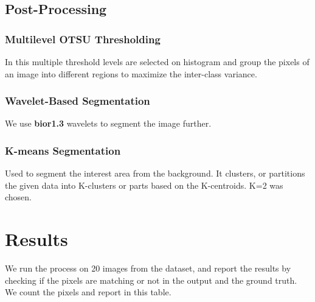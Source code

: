 \documentclass{article}
\begin{document}
\subsection{Post-Processing}

\subsubsection{Multilevel OTSU Thresholding}
In this multiple threshold levels are selected on histogram and group the pixels of an image into different regions to 
maximize the inter-class variance.

\subsubsection{Wavelet-Based Segmentation}
We use \textbf{bior1.3} wavelets to segment the image further.

\subsubsection{K-means Segmentation}
Used to segment the interest area from the background. It clusters, or partitions the given data into K-clusters or parts based on the K-centroids. K=2 was chosen.

\clearpage
\section{Results}
We run the process on 20 images from the dataset, and report the results by checking if the pixels are matching or not in the output and the ground truth. We count the pixels and report in this table.
\end{document}
